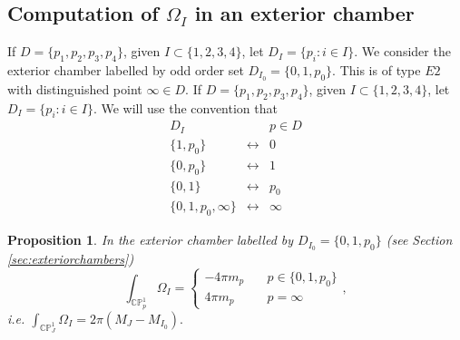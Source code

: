 \documentclass[12pt,letterpaper,reqno]{amsart}
\newtheorem{prop}[thm]{Proposition}
\theoremstyle{remark}
\theoremstyle{definition}
\numberwithin{thm}{section}
\numberwithin{equation}{section}
\numberwithin{figure}{section}
\newcommand{\CP}{\ensuremath{\mathbb {CP}}}
\begin{document}
\subsection{Computation of \texorpdfstring{$\Omega_I$}{the holomorphic symplectic form} in an exterior chamber}
 If $D=\{p_1, p_2, p_3, p_4\}$, given $I \subset \{1, 2, 3, 4\}$, let $D_I = \{p_i: i \in I\}$.
We consider the exterior chamber labelled by odd order set $D_{I_0}=\{0, 1, p_0\}$. This is 
 of type $E2$ with distinguished point $\infty \in D$.
  If $D=\{p_1, p_2, p_3, p_4\}$, given $I \subset \{1, 2, 3, 4\}$, let $D_I = \{p_i: i \in I\}$.
We will use the convention that 
\begin{equation}
\begin{array}{ccc}
D_I & & p \in D\\
\hline
\{1, p_0 \} &\leftrightarrow& 0 \\
\{0, p_0 \} &\leftrightarrow& 1 \\
\{0, 1 \} &\leftrightarrow& p_0 \\
\{0, 1 ,p_0, \infty\} &\leftrightarrow& \infty 
\end{array}
\end{equation}

\begin{prop}\label{prop:exteriorintersection}
In the exterior chamber labelled by $D_{I_0} = \{0, 1, p_0\}$ (see Section \ref{sec:exteriorchambers}) 
  \[\int_{\CP^1_p} \Omega_I = \begin{cases} -4 \pi  m_p &\quad p \in \{0, 1, p_0\}\\
  4 \pi  m_p & \quad p=\infty\end{cases},  \]
  i.e. $\int_{\CP^1_J} \Omega_I = 2 \pi (M_J -M_{I_0}).$
 \end{prop}
\end{document}
